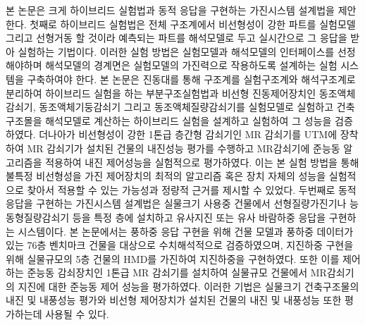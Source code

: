 본 논문은 크게 하이브리드 실험법과 동적 응답을 구현하는 가진시스템 설계법을 제안한다. 첫째로 하이브리드 실험법은 전체 구조계에서 비선형성이 강한 파트를 실험모델 그리고 선형거동 할 것이라 예측되는 파트를 해석모델로 두고 실시간으로 그 응답을 받아 실험하는 기법이다. 이러한 실험 방법은 실험모델과 해석모델의 인터페이스를 선정해야하며 해석모델의 경계면은 실험모델의 가진력으로 작용하도록 설계하는 실험 시스템을 구축하여야 한다. 본 논문은 진동대를 통해 구조계를 실험구조계와 해석구조계로 분리하여 하이브리드 실험을 하는 부분구조실험법과 비선형 진동제어장치인 동조액체감쇠기, 동조액체기둥감쇠기 그리고 동조액체질량감쇠기를 실험모델로 실험하고 건축구조몰을 해석모델로 계산하는 하이브리드 실험을 설계하고 실험하여 그 성능을 검증하였다. 더나아가 비선형성이 강한 1톤급 층간형 감쇠기인 MR 감쇠기를 UTM에 장착하여 MR 감쇠기가 설치된 건물의 내진성능 평가를 수행하고 MR감쇠기에 준능동 알고리즘을 적용하여 내진 제어성능을 실험적으로 평가하였다. 이는 본 실험 방법을 통해 불특정 비선형성을 가진 제어장치의 최적의 알고리즘 혹은 장치 자체의 성능을 실험적으로 찾아서 적용할 수 있는 가능성과 정량적 근거를 제시할 수 있었다. 두번째로 동적 응답을 구현하는 가진시스템 설계법은 실물크기 사용중 건물에서 선형질량가진기나 능동형질량감쇠기 등을 특정 층에 설치하고 유사지진 또는 유사 바람하중 응답을 구현하는 시스템이다. 본 논문에서는 풍하중 응답 구현을 위해 건물 모델과 풍하중 데이터가 있는 76층 벤치마크 건물을 대상으로 수치해석적으로 검증하였으며, 지진하중 구현을 위해 실물규모의 5층 건물의 HMD를 가진하여 지진하중을 구현하였다. 또한 이를 제어하는 준능동 감쇠장치인 1톤급 MR 감쇠기를 설치하여 실물규모 건물에서 MR감쇠기의 지진에 대한 준능동 제어 성능을 평가하였다. 이러한 기법은 실물크기 건축구조물의 내진 및 내풍성능 평가와 비선형 제어장치가 설치된 건물의 내진 및 내풍성능 또한 평가하는데 사용될 수 있다.
